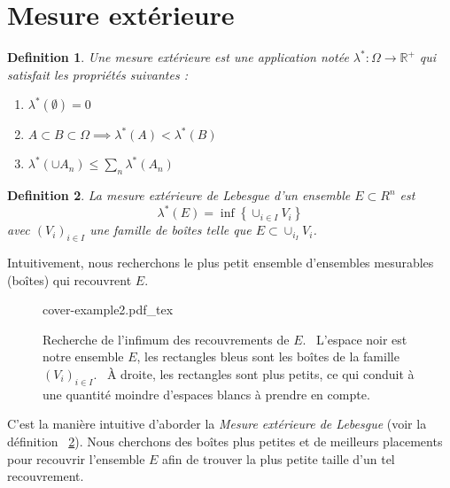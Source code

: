 \documentclass[a4paper]{article}
\newcommand{\incfig}[1]{%
    \def\svgwidth{\columnwidth}
    {#1.pdf_tex}
}
\newcommand{\R}{\mathbb{R}}
\newtheorem{definition}{Definition}[section]
\begin{document}
\section{Mesure extérieure}%
% 
\label{sec:Outer measure}%
\begin{definition}
    Une mesure extérieure est une application notée $\lambda^*: \Omega \to \R^+$ qui satisfait les propriétés suivantes :
    \begin{enumerate}
        \item $\lambda^*(\emptyset) = 0$
        \item $A \subset B \subset \Omega \implies \lambda^*(A) < \lambda^*(B)$ 
        \item $\lambda^*(\cup A_n) \le \sum_n \lambda^*(A_n)$
    \end{enumerate}
\end{definition}%
\begin{definition}\label{defn:lebesgue-outer-measure}
    La mesure extérieure de Lebesgue d'un ensemble $E \subset R^n$ est 
    \[
        \lambda^*(E) = \inf \left\{ \cup_{i \in I} V_i \right\}
    \] 
    avec $(V_i)_{i \in I}$ une famille de boîtes telle que $E \subset \cup_{i_I} V_i$.
\end{definition}%
Intuitivement, nous recherchons le plus petit ensemble d'ensembles mesurables (boîtes) qui recouvrent
$E$.%
\begin{figure}[H]
    \centering
    \incfig{cover-example2}
    \caption{Recherche de l'infimum des recouvrements de $E$. \
        L'espace noir est notre
        ensemble $E$, les rectangles bleus sont les boîtes de la famille $(V_i)_{i \in I}$. \
        À droite, les rectangles sont plus petits, ce qui conduit à une quantité moindre d'espaces blancs à prendre en compte.}
    \label{fig:cover-example2}
\end{figure}%
C’est la manière intuitive d’aborder la \textit{Mesure extérieure de Lebesgue} (voir la définition ~\ref{defn:lebesgue-outer-measure}). Nous cherchons des boîtes plus petites et de meilleurs placements pour recouvrir l’ensemble $E$ afin de trouver la plus petite taille d’un tel recouvrement.
\end{document}
